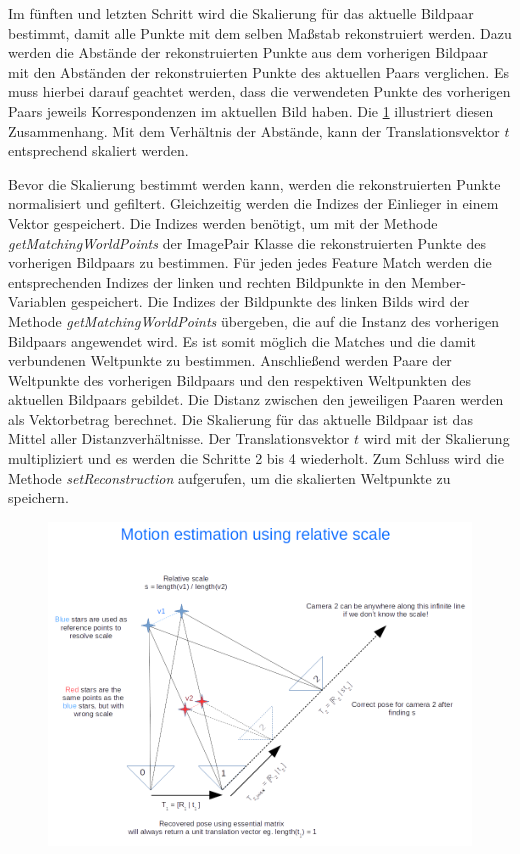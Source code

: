 Im fünften und letzten Schritt wird die Skalierung für das aktuelle Bildpaar bestimmt, damit alle Punkte mit dem selben Maßstab rekonstruiert werden.  
Dazu werden die Abstände der rekonstruierten Punkte aus dem vorherigen Bildpaar mit den Abständen der rekonstruierten Punkte des aktuellen Paars verglichen.
Es muss hierbei darauf geachtet werden, dass die verwendeten Punkte des vorherigen Paars jeweils Korrespondenzen im aktuellen Bild haben.
Die \cref{fig:sfm-scaling} illustriert diesen Zusammenhang.
Mit dem Verhältnis der Abstände, kann der Translationsvektor $t$ entsprechend skaliert werden.

Bevor die Skalierung bestimmt werden kann, werden die rekonstruierten Punkte normalisiert und gefiltert.
Gleichzeitig werden die Indizes der Einlieger in einem Vektor gespeichert. 
Die Indizes werden benötigt, um mit der Methode \emph{getMatchingWorldPoints} der ImagePair Klasse die rekonstruierten Punkte des vorherigen Bildpaars zu bestimmen.
Für jeden jedes Feature Match werden die entsprechenden Indizes der linken und rechten Bildpunkte in den Member-Variablen gespeichert.
Die Indizes der Bildpunkte des linken Bilds wird der Methode \emph{getMatchingWorldPoints} übergeben, die auf die Instanz des vorherigen Bildpaars angewendet wird.
Es ist somit möglich die Matches und die damit verbundenen Weltpunkte zu bestimmen.
Anschließend werden Paare der Weltpunkte des vorherigen Bildpaars und den respektiven Weltpunkten des aktuellen Bildpaars gebildet.
Die Distanz zwischen den jeweiligen Paaren werden als Vektorbetrag berechnet.
Die Skalierung für das aktuelle Bildpaar ist das Mittel aller Distanzverhältnisse.
Der Translationsvektor $t$ wird mit der Skalierung multipliziert und es werden die Schritte 2 bis 4 wiederholt.
Zum Schluss wird die Methode \emph{setReconstruction} aufgerufen, um die skalierten Weltpunkte zu speichern.
\begin{figure}
    \includegraphics[width=\textwidth]{src/img/nghiaho_2017_sfm_scaling}
    \caption{~\cite{nghiaho_2017}}
    \label{fig:sfm-scaling}
\end{figure}
